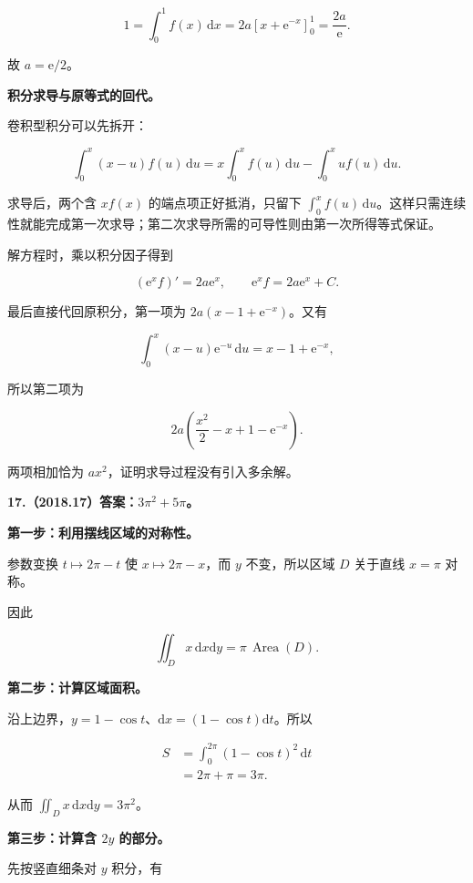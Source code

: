 \documentclass[UTF8,11pt,fontset=windows]{ctexart}
\begin{document}
$$
1=\int_0^1f(x)\,\mathrm dx
=2a\left[x+\mathrm e^{-x}\right]_0^1
=\frac{2a}{\mathrm e}.
$$

故 $a=\mathrm e/2$。

\textbf{积分求导与原等式的回代。}

卷积型积分可以先拆开：

$$
\int_0^x(x-u)f(u)\,\mathrm du
=x\int_0^xf(u)\,\mathrm du-\int_0^xu f(u)\,\mathrm du.
$$

求导后，两个含 $xf(x)$ 的端点项正好抵消，只留下 $\int_0^xf(u)\,\mathrm du$。这样只需连续性就能完成第一次求导；第二次求导所需的可导性则由第一次所得等式保证。

解方程时，乘以积分因子得到

$$
(\mathrm e^xf)'=2a\mathrm e^x,
\qquad
\mathrm e^xf=2a\mathrm e^x+C.
$$

最后直接代回原积分，第一项为 $2a(x-1+\mathrm e^{-x})$。又有

$$
\int_0^x(x-u)\mathrm e^{-u}\,\mathrm du=x-1+\mathrm e^{-x},
$$

所以第二项为

$$
2a\left(\frac{x^2}{2}-x+1-\mathrm e^{-x}\right).
$$

两项相加恰为 $ax^2$，证明求导过程没有引入多余解。

\clearpage

\textbf{17.（2018.17）答案：$3\pi^2+5\pi$。}

\textbf{第一步：利用摆线区域的对称性。}

参数变换 $t\mapsto2\pi-t$ 使 $x\mapsto2\pi-x$，而 $y$ 不变，所以区域 $D$ 关于直线 $x=\pi$ 对称。

因此

$$
\iint_Dx\,\mathrm dx\mathrm dy=\pi\,\operatorname{Area}(D).
$$

\textbf{第二步：计算区域面积。}

沿上边界，$y=1-\cos t$、$\mathrm dx=(1-\cos t)\mathrm dt$。所以

$$
\begin{aligned}
S&=\int_0^{2\pi}(1-\cos t)^2\,\mathrm dt\\
&=2\pi+\pi=3\pi.
\end{aligned}
$$

从而 $\iint_Dx\,\mathrm dx\mathrm dy=3\pi^2$。

\textbf{第三步：计算含 $2y$ 的部分。}

先按竖直细条对 $y$ 积分，有
\end{document}

